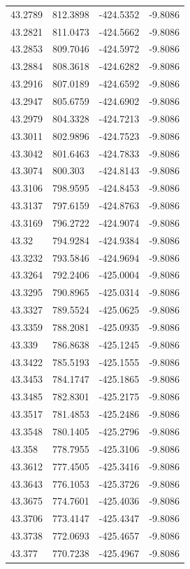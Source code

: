 \begin{table}[H]
\begin{tabular}{llll}
43.2789 & 812.3898 & -424.5352 & -9.8086 \\
43.2821 & 811.0473 & -424.5662 & -9.8086 \\
43.2853 & 809.7046 & -424.5972 & -9.8086 \\
43.2884 & 808.3618 & -424.6282 & -9.8086 \\
43.2916 & 807.0189 & -424.6592 & -9.8086 \\
43.2947 & 805.6759 & -424.6902 & -9.8086 \\
43.2979 & 804.3328 & -424.7213 & -9.8086 \\
43.3011 & 802.9896 & -424.7523 & -9.8086 \\
43.3042 & 801.6463 & -424.7833 & -9.8086 \\
43.3074 & 800.303 & -424.8143 & -9.8086 \\
43.3106 & 798.9595 & -424.8453 & -9.8086 \\
43.3137 & 797.6159 & -424.8763 & -9.8086 \\
43.3169 & 796.2722 & -424.9074 & -9.8086 \\
43.32 & 794.9284 & -424.9384 & -9.8086 \\
43.3232 & 793.5846 & -424.9694 & -9.8086 \\
43.3264 & 792.2406 & -425.0004 & -9.8086 \\
43.3295 & 790.8965 & -425.0314 & -9.8086 \\
43.3327 & 789.5524 & -425.0625 & -9.8086 \\
43.3359 & 788.2081 & -425.0935 & -9.8086 \\
43.339 & 786.8638 & -425.1245 & -9.8086 \\
43.3422 & 785.5193 & -425.1555 & -9.8086 \\
43.3453 & 784.1747 & -425.1865 & -9.8086 \\
43.3485 & 782.8301 & -425.2175 & -9.8086 \\
43.3517 & 781.4853 & -425.2486 & -9.8086 \\
43.3548 & 780.1405 & -425.2796 & -9.8086 \\
43.358 & 778.7955 & -425.3106 & -9.8086 \\
43.3612 & 777.4505 & -425.3416 & -9.8086 \\
43.3643 & 776.1053 & -425.3726 & -9.8086 \\
43.3675 & 774.7601 & -425.4036 & -9.8086 \\
43.3706 & 773.4147 & -425.4347 & -9.8086 \\
43.3738 & 772.0693 & -425.4657 & -9.8086 \\
43.377 & 770.7238 & -425.4967 & -9.8086 \\

\end{tabular}
\end{table}
